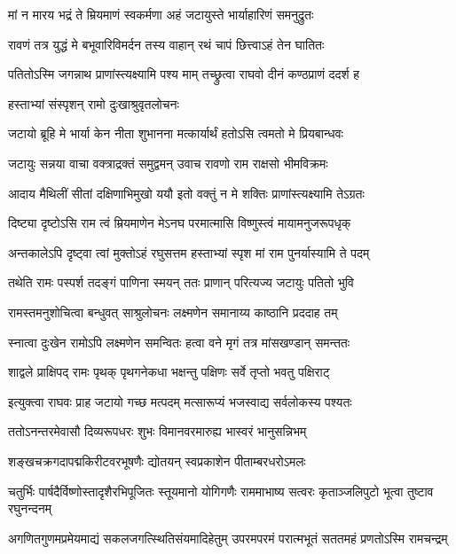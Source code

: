 \twolineshloka
{मां न मारय भद्रं ते म्रियमाणं स्वकर्मणा}
{अहं जटायुस्ते भार्याहारिणं समनुद्रुतः} %

\twolineshloka
{रावणं तत्र युद्धं मे बभूवारिविमर्दन}
{तस्य वाहान् रथं चापं छित्त्वाऽहं तेन घातितः} %

\twolineshloka
{पतितोऽस्मि जगन्नाथ प्राणांस्त्यक्ष्यामि पश्य माम्}
{तच्छ्रुत्वा राघवो दीनं कण्ठप्राणं ददर्श ह} %

\onelineshloka
{हस्ताभ्यां संस्पृशन् रामो दुःखाश्रुवृतलोचनः} %


\twolineshloka
{जटायो ब्रूहि मे भार्या केन नीता शुभानना}
{मत्कार्यार्थं हतोऽसि त्वमतो मे प्रियबान्धवः} %

\twolineshloka
{जटायुः सन्नया वाचा वक्त्राद्रक्तं समुद्वमन्}
{उवाच रावणो राम राक्षसो भीमविक्रमः} %

\twolineshloka
{आदाय मैथिलीं सीतां दक्षिणाभिमुखो ययौ}
{इतो वक्तुं न मे शक्तिः प्राणांस्त्यक्ष्यामि तेऽग्रतः} %

\twolineshloka
{दिष्ट्या दृष्टोऽसि राम त्वं म्रियमाणेन मेऽनघ}
{परमात्मासि विष्णुस्त्वं मायामनुजरूपधृक्} %

\twolineshloka
{अन्तकालेऽपि दृष्ट्वा त्वां मुक्तोऽहं रघुसत्तम}
{हस्ताभ्यां स्पृश मां राम पुनर्यास्यामि ते पदम्} %

\twolineshloka
{तथेति रामः पस्पर्श तदङ्गं पाणिना स्मयन्}
{ततः प्राणान् परित्यज्य जटायुः पतितो भुवि} %

\twolineshloka
{रामस्तमनुशोचित्वा बन्धुवत् साश्रुलोचनः}
{लक्ष्मणेन समानाय्य काष्ठानि प्रददाह तम्} %

\twolineshloka
{स्नात्वा दुःखेन रामोऽपि लक्ष्मणेन समन्वितः}
{हत्वा वने मृगं तत्र मांसखण्डान् समन्ततः} %

\twolineshloka
{शाद्वले प्राक्षिपद् रामः पृथक् पृथगनेकधा}
{भक्षन्तु पक्षिणः सर्वे तृप्तो भवतु पक्षिराट्} %

\twolineshloka
{इत्युक्त्वा राघवः प्राह जटायो गच्छ मत्पदम्}
{मत्सारूप्यं भजस्वाद्य सर्वलोकस्य पश्यतः} %

\twolineshloka
{ततोऽनन्तरमेवासौ दिव्यरूपधरः शुभः}
{विमानवरमारुह्य भास्वरं भानुसन्निभम्} %

\twolineshloka
{शङ्खचक्रगदापद्मकिरीटवरभूषणैः}
{द्योतयन् स्वप्रकाशेन पीताम्बरधरोऽमलः} %

\threelineshloka
{चतुर्भिः पार्षदैर्विष्णोस्तादृशैरभिपूजितः}
{स्तूयमानो योगिगणैः राममाभाष्य सत्वरः}
{कृताञ्जलिपुटो भूत्वा तुष्टाव रघुनन्दनम्} %


\fourlineindentedshloka
{अगणितगुणमप्रमेयमाद्यं}
{सकलजगत्स्थितिसंयमादिहेतुम्}
{उपरमपरमं परात्मभूतं}
{सततमहं प्रणतोऽस्मि रामचन्द्रम्} %

